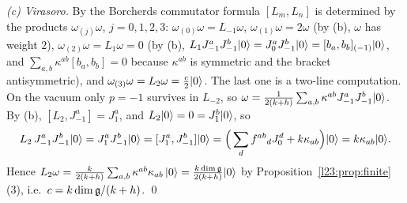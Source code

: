 \emph{(c) Virasoro.} By the Borcherds commutator formula $[L_m,L_n]$ is determined by the products $\omega_{(j)}\omega$, $j=0,1,2,3$:
$\omega_{(0)}\omega=L_{-1}\omega$, $\omega_{(1)}\omega=2\omega$ (by (b), $\omega$ has weight $2$), $\omega_{(2)}\omega=L_1\omega=0$ (by (b),
$L_1J^a_{-1}J^b_{-1}|0\rangle=J^a_0J^b_{-1}|0\rangle=[b_a,b_b]_{(-1)}|0\rangle$, and $\sum_{a,b}\kappa^{ab}[b_a,b_b]=0$ because
$\kappa^{ab}$ is symmetric and the bracket antisymmetric), and $\omega_{(3)}\omega=L_2\omega=\frac c2|0\rangle$. The last one is a two-line computation. On the vacuum only
$p=-1$ survives in $L_{-2}$, so $\omega=\frac1{2(k+h)}\sum_{a,b}\kappa^{ab}J^a_{-1}J^b_{-1}|0\rangle$. By (b),
$[L_2,J^a_{-1}]=J^a_1$, and $L_2|0\rangle=0=J^b_1|0\rangle$, so
\begin{equation*}
L_2\,J^a_{-1}J^b_{-1}|0\rangle=J^a_1J^b_{-1}|0\rangle=[J^a_1,J^b_{-1}]|0\rangle
=\Big(\sum_df^{ab}{}_dJ^d_0+k\kappa_{ab}\Big)|0\rangle=k\kappa_{ab}|0\rangle .
\end{equation*}
Hence $L_2\omega=\frac{k}{2(k+h)}\sum_{a,b}\kappa^{ab}\kappa_{ab}\,|0\rangle=\frac{k\dim\mathfrak g}{2(k+h)}|0\rangle$ by
Proposition~\ref{l23:prop:finite}(3), i.e.\ $c=k\dim\mathfrak g/(k+h)$. \qed

